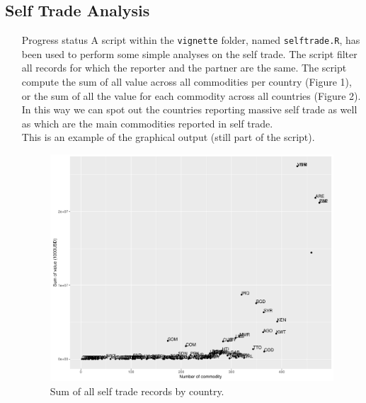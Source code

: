 \documentclass[nojss]{jss}\usepackage[]{graphicx}\usepackage[]{color}
\begin{document}
\subsection{Self Trade Analysis}
\begin{itemize}
\item[Progress status] A script within the {\tt vignette} folder, named {\tt selftrade.R}, has been used to perform some simple analyses on the self trade. The script filter all records for which the reporter and the partner are the same. The script compute the sum of all value across all commodities per country (Figure 1), or the sum of all the value for each commodity across all countries (Figure 2). In this way we can spot out the countries reporting massive self trade as well as which are the main commodities reported in self trade.\\
This is an example of the graphical output (still part of the script).
\begin{center}
\begin{figure}
\includegraphics[scale=0.5]{../selftrade_by_country_name}
\caption{Sum of all self trade records by country.}
\end{figure}
\end{center}


\end{itemize}
\end{document}
